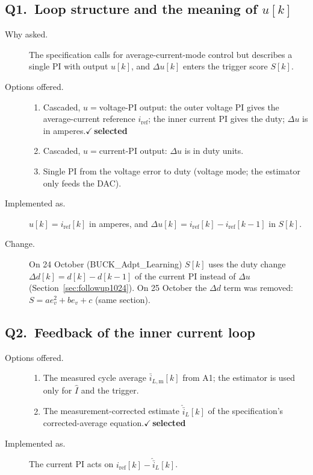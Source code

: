 \documentclass[11pt]{article}
\newcommand{\chosen}{\hfill$\checkmark$\,\textbf{selected}}
\begin{document}
\subsection*{Q1.\ Loop structure and the meaning of $u[k]$}
\begin{description}
\item[Why asked.] The specification calls for average-current-mode
control but describes a single PI with output $u[k]$, and
$\Delta u[k]$ enters the trigger score $S[k]$.
\item[Options offered.]\leavevmode
  \begin{enumerate}
  \item Cascaded, $u={}$voltage-PI output: the outer voltage PI gives
        the average-current reference $i_{\mathrm{ref}}$; the inner
        current PI gives the duty; $\Delta u$ is in amperes.\chosen
  \item Cascaded, $u={}$current-PI output: $\Delta u$ is in duty units.
  \item Single PI from the voltage error to duty (voltage mode; the
        estimator only feeds the DAC).
  \end{enumerate}
\item[Implemented as.] $u[k]=i_{\mathrm{ref}}[k]$ in amperes, and
$\Delta u[k]=i_{\mathrm{ref}}[k]-i_{\mathrm{ref}}[k-1]$ in $S[k]$.
\item[Change.] On 24 October (BUCK\_Adpt\_Learning) $S[k]$ uses the duty
change $\Delta d[k]=d[k]-d[k-1]$ of the current PI instead of $\Delta u$
(Section~\ref{sec:followup1024}). On 25 October the $\Delta d$ term was
removed: $S=a e_v^2+b e_v+c$ (same section).
\end{description}

\subsection*{Q2.\ Feedback of the inner current loop}
\begin{description}
\item[Options offered.]\leavevmode
  \begin{enumerate}
  \item The measured cycle average $\bar{i}_{L,\mathrm{m}}[k]$ from A1;
        the estimator is used only for $\hat{I}$ and the trigger.
  \item The measurement-corrected estimate $\hat{\bar{i}}_L[k]$ of the
        specification's corrected-average equation.\chosen
  \end{enumerate}
\item[Implemented as.] The current PI acts on
$i_{\mathrm{ref}}[k]-\hat{\bar{i}}_L[k]$.
\end{description}
\end{document}
